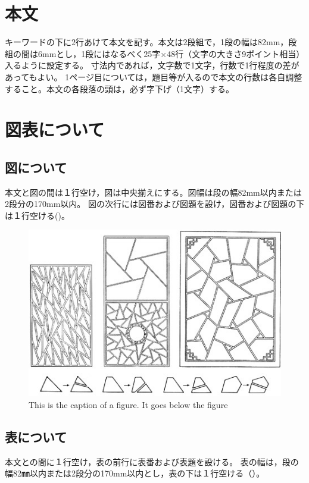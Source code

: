 \documentclass[base=10pt,magstyle=real,a4paper,twocolumn,xelatex,pandoc,jafont=noto]{bxjsarticle}%
\begin{document}
\section{本文}
キーワードの下に2行あけて本文を記す。本文は2段組で，1段の幅は82mm，段組の間は6mmとし，1段にはなるべく25字×48行（文字の大きさ9ポイント相当）入るように設定する。
寸法内であれば，文字数で1文字，行数で1行程度の差があってもよい。
1ページ目については，題目等が入るので本文の行数は各自調整すること。本文の各段落の頭は，必ず字下げ（1文字）する。


\section{図表について}
\subsection{図について}
本文と図の間は１行空け，図は中央揃えにする。図幅は段の幅82mm以内または2段分の170mm以内。
図の次行には図番および図題を設け，図番および図題の下は１行空ける()。
\begin{figure}[H]
	\centering
	\includegraphics[width=1\linewidth]{../figure/figure_sympo.jpg}
	\caption{This is the caption of a figure. It goes below the figure}
	\label{fig:figuresympo}
\end{figure}

\subsection{表について}
本文との間に１行空け，表の前行に表番および表題を設ける。
表の幅は，段の幅82㎜以内または2段分の170mm以内とし，表の下は１行空ける（）。
\end{document}
